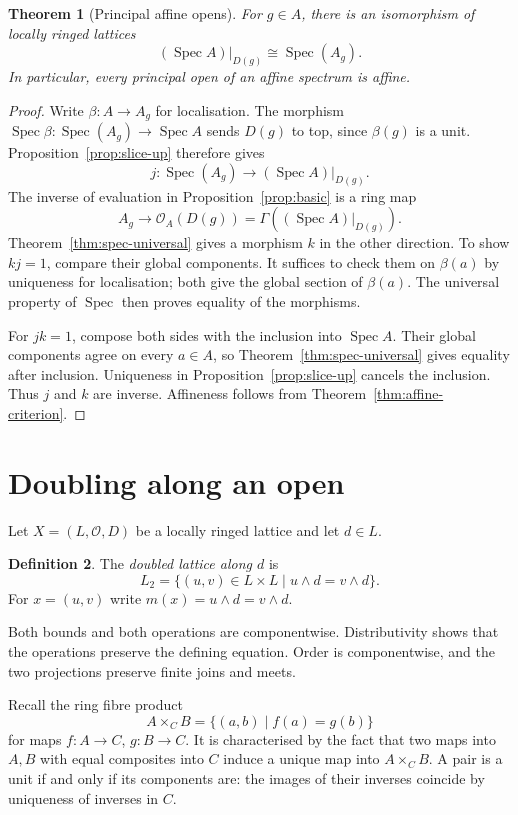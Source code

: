 \documentclass[11pt]{amsart}
\newtheorem{theorem}{Theorem}[section]
\theoremstyle{definition}
\newtheorem{definition}[theorem]{Definition}
\theoremstyle{remark}
\newcommand{\Spec}{\operatorname{Spec}}
\newcommand{\OO}{\mathcal O}
\begin{document}
\begin{theorem}[Principal affine opens]\label{thm:spec-basic}
For $g\in A$, there is an isomorphism of locally ringed lattices
\[
 (\Spec A)|_{D(g)}\cong\Spec(A_g).
\]
In particular, every principal open of an affine spectrum is affine.
\end{theorem}
\begin{proof}
Write $\beta:A\to A_g$ for localisation. The morphism
$\Spec\beta:\Spec(A_g)\to\Spec A$ sends $D(g)$ to top, since
$\beta(g)$ is a unit. Proposition~\ref{prop:slice-up} therefore gives
\[
 j:\Spec(A_g)\longrightarrow(\Spec A)|_{D(g)}.
\]
The inverse of evaluation in Proposition~\ref{prop:basic} is a ring map
\[
 A_g\longrightarrow\OO_A(D(g))
                =\Gamma((\Spec A)|_{D(g)}).
\]
Theorem~\ref{thm:spec-universal} gives a morphism $k$ in the other
direction. To show $kj=1$, compare their global components. It suffices
to check them on $\beta(a)$ by uniqueness for localisation; both give
the global section of $\beta(a)$. The universal property of $\Spec$
then proves equality of the morphisms.

For $jk=1$, compose both sides with the inclusion into $\Spec A$.
Their global components agree on every $a\in A$, so
Theorem~\ref{thm:spec-universal} gives equality after inclusion.
Uniqueness in Proposition~\ref{prop:slice-up} cancels the inclusion.
Thus $j$ and $k$ are inverse. Affineness follows from
Theorem~\ref{thm:affine-criterion}.
\end{proof}

\section{Doubling along an open}

Let $X=(L,\OO,D)$ be a locally ringed lattice and let $d\in L$.

\begin{definition}
The \emph{doubled lattice along $d$} is
\[
 L_2=\{(u,v)\in L\times L\mid u\wedge d=v\wedge d\}.
\]
For $x=(u,v)$ write $m(x)=u\wedge d=v\wedge d$.
\end{definition}

Both bounds and both operations are componentwise. Distributivity shows
that the operations preserve the defining equation. Order is
componentwise, and the two projections preserve finite joins and meets.

Recall the ring fibre product
\[
 A\times_C B=\{(a,b)\mid f(a)=g(b)\}
\]
for maps $f:A\to C$, $g:B\to C$. It is characterised by the fact that
two maps into $A,B$ with equal composites into $C$ induce a unique map
into $A\times_C B$. A pair is a unit if and only if its components are:
the images of their inverses coincide by uniqueness of inverses in $C$.
\end{document}
